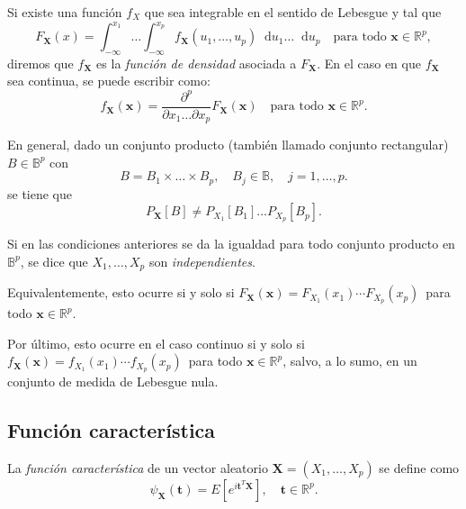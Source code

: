\begin{ndef}
    Si existe una función $f_X$ que sea integrable en el sentido de Lebesgue y tal que
    \[
    F_{\boldsymbol X}(x) = \int^{x_1}_{-\infty} \dots \int^{x_p}_{-\infty} f_{\boldsymbol X}(u_1, \dots,  u_p) \mathop{}\!\mathrm{d}u_1 \dots \mathop{}\!\mathrm{d}u_p \quad \text{para todo } \boldsymbol  x \in \mathbb{R}^p
    ,\]
    diremos que $f_{\boldsymbol X}$ es la \textit{función de densidad} asociada a  $F_{\boldsymbol X}$. En el caso en que $f_{\boldsymbol X}$ sea continua, se puede escribir como:
    \[
    f_{\boldsymbol X}(\boldsymbol x) = \frac{\partial^p}{\partial x_1 \dots \partial x_p} F_{\boldsymbol X}(\boldsymbol x) \quad \text{para todo } \boldsymbol x \in \mathbb{R}^p
    .\]
\end{ndef}

En general, dado un conjunto producto (también llamado conjunto rectangular) $B \in \mathbb{B}^p$ con
\[
    B = B_1 \times \dots \times B_p,\quad B_j \in \mathbb{B}, \quad j = 1, \dots, p
.\]
se tiene que
\[
P_{\boldsymbol X}[B] \neq P_{X_1}[B_1] \dots  P_{X_p}[B_p].
\]

\begin{ndef}
    Si en las condiciones anteriores se da la igualdad para todo conjunto producto en \(\mathbb{B}^p\), se dice que \(X_1, \dots, X_p\) son \textit{independientes}.

    Equivalentemente, esto ocurre si y solo si \(
    F_{\boldsymbol X} (\boldsymbol x) = F_{X_1} (x_1) \cdots F_{X_p}(x_p)\,\) para todo \(\boldsymbol x \in \mathbb{R}^p\).

    Por último, esto ocurre en el caso continuo si y solo si \(f_{\boldsymbol X} (\boldsymbol x) = f_{X_1}(x_1) \cdots f_{X_p}(x_p)\,\) para todo \(\boldsymbol x \in \mathbb{R}^p\), salvo, a lo sumo, en un conjunto de medida de Lebesgue nula.
\end{ndef}

\subsection{Función característica}

\begin{ndef}
    La \textit{función característica} de un vector aleatorio \(\boldsymbol X = (X_1,\dots,X_p)\) se define como \[\psi_{\boldsymbol X}(\boldsymbol t)=E\left[e^{i\boldsymbol t^T\boldsymbol X}\right], \quad \boldsymbol t\in \mathbb{R}^p.\]
\end{ndef}

